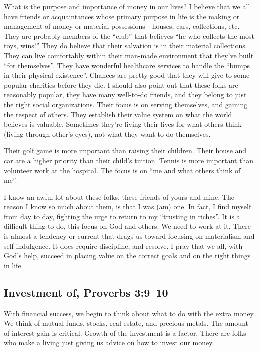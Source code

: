 \documentclass[12pt]{memoir}
\begin{document}
What is the purpose and importance of money in our lives? I believe
that we all have friends or acquaintances whose primary purpose in
life is the making or management of money or material possessions---houses,
cars, collections, etc. They are probably members of the ``club''
that believes ``he who collects the most toys, wins!'' They do believe
that their salvation is in their material collections. They can live
comfortably within their man-made environment that they've built ``for
themselves''. They have wonderful healthcare services to handle the
``bumps in their physical existence''. Chances are pretty good that
they will give to some popular charities before they die. I should
also point out that these folks are reasonably popular, they have
many well-to-do friends, and they belong to just the right social
organizations. Their focus is on serving themselves, and gaining the
respect of others. They establish their value system on what the world
believes is valuable. Sometimes they're living their lives for what
others think (living through other's eyes), not what they want to
do themselves.

Their golf game is more important than raising their children. Their
house and car are a higher priority than their child's tuition. Tennis
is more important than volunteer work at the hospital. The focus is
on ``me and what others think of me''. 

I know an awful lot about these folks, these friends of yours and
mine. The reason I know so much about them, is that I was (am) one.
In fact, I find myself from day to day, fighting the urge to return
to my ``trusting in riches''. It is a difficult thing to do, this
focus on God and others. We need to work at it. There is almost a
tendency or current that drags us toward focusing on materialism and
self-indulgence. It does require discipline, and resolve. I pray that
we all, with God's help, succeed in placing value on the correct goals
and on the right things in life. 

\subsection{Investment of, Proverbs 3:9--10}

With financial success, we begin to think about what to do with the
extra money. We think of mutual funds, stocks, real estate, and precious
metals. The amount of interest gain is critical. Growth of the investment
is a factor. There are folks who make a living just giving us advice
on how to invest our money. 
\end{document}

